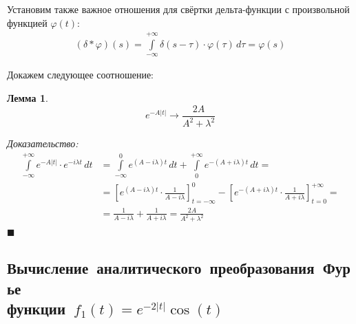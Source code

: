 \documentclass[11pt, oneside, draft]{article}
\numberwithin{equation}{section}
\newtheorem{lemma}[theorem]{Лемма}
\renewenvironment{proof}{
\noindent\textit{Доказательство: }} {\qed}
\newcommand \rarrow{\rightarrow}
\newcommand \intinf[1][{\,dt}]{ \int\limits_{-\infty}^{+\infty}{{#1}}}
\renewcommand \qed{$\blacksquare$}
\begin{document}
    { Установим также важное отношения для свёртки дельта-функции с произвольной функцией \(\varphi(t)\): 
    \begin{align}\label{delta:conv}
        \boxed{\left(\delta * \varphi \right) (s) = \intinf[{\delta(s - \tau) \cdot \varphi(\tau)\, d\tau} = \varphi(s)]} 
    \end{align}
    }

    \noindent Докажем следующее соотношение: 
    \begin{lemma}
        \begin{equation}\label{fourier:exp_abs} 
            e^{-A|t|} \rarrow \dfrac{2A}{A^2 + \lambda^2} 
        \end{equation}
    \end{lemma}
    \begin{proof}
        \[ 
        \begin{split}
            \intinf[{e^{-A|t|} \cdot e^{-i\lambda t} \, dt}] &= \int\limits_{-\infty}^0{e^{(A - i\lambda) t} \, dt} + \int\limits_0^{+\infty}{e^{-(A + i\lambda) t} \, dt} = \\
            &= \left[ e^{(A - i\lambda)t} \cdot \frac{1}{A - i\lambda} \right]_{t = -\infty}^{0} - \left[ e^{-(A + i\lambda)t} \cdot \frac{1}{A + i\lambda} \right]_{t = 0}^{+\infty} = \\
            &=\frac{1}{A - i\lambda} + \frac{1}{A + i\lambda} = \frac{2A}{A^2 + \lambda^2} 
        \end{split}
        \]
    \end{proof}


    \subsection{Вычисление~аналитического~преобразования~Фурье\\функции~\(f_1(t) = e^{-2|t|} \cos(t)\)}
\end{document}
